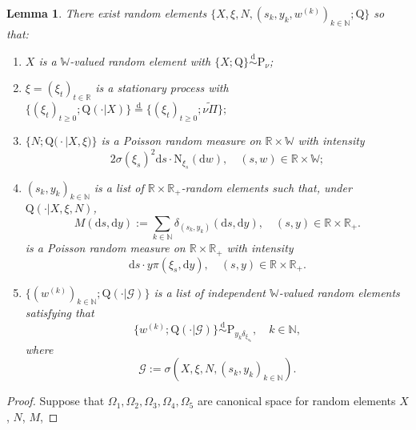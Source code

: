 \documentclass[12pt,a4paper]{amsart}
\numberwithin{equation}{section}
\theoremstyle{plain}
\newtheorem{lem}[thm]{Lemma}
\theoremstyle{definition}
\theoremstyle{remark}
\begin{document}
\begin{lem}  \label{thm:E.16}
	There exist random elements
  	$\big\{X, \xi, N, (s_k, y_k,w^{(k)})_{k\in \mathbb N}; \mathrm Q\big\}$
	so that:
\begin{enumerate}
\item
	$X$ is a $\mathbb W$-valued random element with $\{X; \mathrm Q\} \overset{\text{d}} \sim \mathrm P_\nu$;
\item
		$\xi = (\xi_t)_{t\in \mathbb R}$
	 is a stationary process with 
	 $\{(\xi_t)_{t \geq 0}; \mathrm Q(\cdot | X)\} \overset{\text{d}} = \{(\xi_t)_{t \geq 0}; \widetilde{\nu\Pi}\};$
\item
	$\big\{N; \mathrm Q\big(\cdot \big|X,\xi\big)\big\}$ is a Poisson random measure on $\mathbb R\times \mathbb W$ with intensity
\[
	2 \sigma(\xi_s)^2 {\mathrm d}s \cdot \mathrm N_{\xi_s}({\mathrm d}w),
	\quad (s,w)\in \mathbb R\times \mathbb W;
\]
\item
	$(s_k, y_k)_{k\in \mathbb N}$ is a list of $\mathbb R \times \mathbb R_+$-random elements %
	such that, under $\mathrm Q(\cdot | X, \xi, N)$, 
\[
	M(\mathrm ds,\mathrm dy)
	:= \sum_{k\in \mathbb N} \delta_{(s_k, y_k)}(\mathrm ds,\mathrm dy), \quad (s,y)\in \mathbb R \times \mathbb R_+.
\]	
is a Poisson random measure on $\mathbb R \times \mathbb R_+$ with intensity
\[
	\mathrm ds \cdot y \pi(\xi_s, \mathrm dy), \quad (s,y)\in \mathbb R \times \mathbb R_+.
\]
\item
	$\{(w^{(k)})_{k\in \mathbb N}; \mathrm Q(\cdot|\mathscr G)\}$ is a list of independent $\mathbb W$-valued random elements satisfying that
\[
	\{w^{(k)}; \mathrm Q(\cdot| \mathscr G)\}
	\overset{\text{d}}\sim \mathrm P_{y_k\delta_{\xi_{s_k}}},
	\quad k\in \mathbb N,
\]
	where
\[
	\mathscr G
	:= \sigma(X, \xi, N, (s_k, y_k)_{k\in \mathbb N}).
\]
\end{enumerate}
\end{lem}
\begin{proof}
	Suppose that $\Omega_1,\Omega_2,\Omega_3,\Omega_4,\Omega_5$ are canonical space for random elements $X$, $N$, $M$, 
\end{proof}
\end{document}
